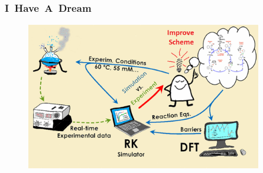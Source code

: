 \small
\frame
{
	\frametitle{\rm{I~Have~A~Dream}}
\begin{figure}[h!]
\vspace*{-0.18in}
\centering
\includegraphics[height=2.55in,width=4.05in]{Figures/Schematic_Material-Design.png}
\label{Schematic_Material-Design}
\end{figure} 
}

